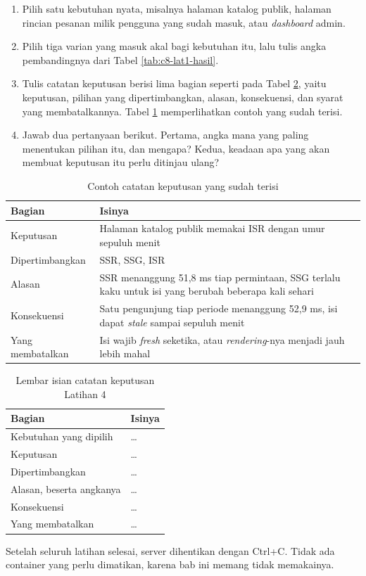 \begin{enumerate}
  \item Pilih satu kebutuhan nyata, misalnya halaman katalog publik, halaman
        rincian pesanan milik pengguna yang sudah masuk, atau \textit{dashboard}
        admin.
  \item Pilih tiga varian yang masuk akal bagi kebutuhan itu, lalu tulis
        angka pembandingnya dari Tabel \ref{tab:c8-lat1-hasil}.
  \item Tulis catatan keputusan berisi lima bagian seperti pada Tabel
        \ref{tab:c8-lat4-hasil}, yaitu keputusan, pilihan yang
        dipertimbangkan, alasan, konsekuensi, dan syarat yang
        membatalkannya. Tabel \ref{tab:c8-lat4-contoh} memperlihatkan
        contoh yang sudah terisi.
  \item Jawab dua pertanyaan berikut. Pertama, angka mana yang paling
        menentukan pilihan itu, dan mengapa? Kedua, keadaan apa yang akan
        membuat keputusan itu perlu ditinjau ulang?
\end{enumerate}

\begin{table}[!htb]
  \centering
  \caption{Contoh catatan keputusan yang sudah terisi}
  \label{tab:c8-lat4-contoh}
  \begin{tabularx}{\textwidth}{lX}
    \hline
    \textbf{Bagian} & \textbf{Isinya} \\
    \hline
    Keputusan & Halaman katalog publik memakai ISR dengan umur sepuluh menit \\
    \hline
    Dipertimbangkan & SSR, SSG, ISR \\
    \hline
    Alasan & SSR menanggung 51,8 ms tiap permintaan, SSG terlalu kaku untuk isi yang berubah beberapa kali sehari \\
    \hline
    Konsekuensi & Satu pengunjung tiap periode menanggung 52,9 ms, isi dapat \textit{stale} sampai sepuluh menit \\
    \hline
    Yang membatalkan & Isi wajib \textit{fresh} seketika, atau \textit{rendering}-nya menjadi jauh lebih mahal \\
    \hline
  \end{tabularx}
\end{table}

\begin{table}[!htb]
  \centering
  \caption{Lembar isian catatan keputusan Latihan 4}
  \label{tab:c8-lat4-hasil}
  \begin{tabularx}{\textwidth}{lX}
    \hline
    \textbf{Bagian} & \textbf{Isinya} \\
    \hline
    Kebutuhan yang dipilih & \dots \\
    \hline
    Keputusan & \dots \\
    \hline
    Dipertimbangkan & \dots \\
    \hline
    Alasan, beserta angkanya & \dots \\
    \hline
    Konsekuensi & \dots \\
    \hline
    Yang membatalkan & \dots \\
    \hline
  \end{tabularx}
\end{table}

Setelah seluruh latihan selesai, server dihentikan dengan Ctrl+C. Tidak ada
container yang perlu dimatikan, karena bab ini memang tidak memakainya.
